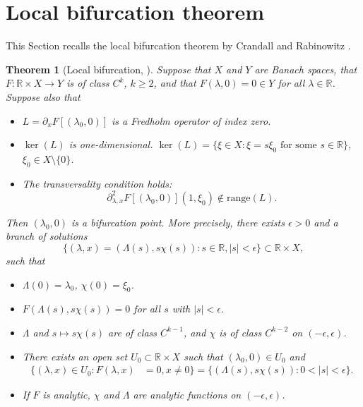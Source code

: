 \documentclass[12pt]{amsart}
\newtheorem{theorem}{Theorem}[section]
\theoremstyle{remark}
\theoremstyle{definition}
\numberwithin{equation}{section}
\begin{document}
\section{Local bifurcation theorem} \label{s:bifurcation}
This Section recalls the local bifurcation theorem by Crandall and Rabinowitz \cite{MR288640}.
\begin{theorem}[Local bifurcation, \cite{MR288640}]
Suppose that $X$ and $Y$ are Banach spaces, that $F : \mathbb{R} \times X \to Y$ is of class $C^k$, $k \geq 2$, and that $F(\lambda, 0) = 0 \in Y$ for all $\lambda \in \mathbb{R}$. Suppose also that
\begin{itemize}
\item $L = \partial_x F[(\lambda_0, 0)]$ is a Fredholm operator of index zero.

\item $\ker(L)$ is one-dimensional.
 $\ker(L) = \{\xi \in X : \xi = s\xi_0 \text{ for some } s \in \mathbb{R} \}$, $\xi_0 \in X \setminus \{0\}$.

\item The transversality condition holds:
\begin{equation*}
\partial_{\lambda, x}^2 F[(\lambda_0, 0)](1, \xi_0) \notin \text{range}(L). 
\end{equation*}
\end{itemize}
Then $(\lambda_0, 0)$ is a bifurcation point. More precisely, there exists $\epsilon > 0$ and a branch of solutions
\[
    \{(\lambda, x) = (\Lambda(s), s\chi(s)) : s \in \mathbb{R}, |s| < \epsilon \} \subset \mathbb{R} \times X,
\]
such that 
\begin{itemize}
\item $\Lambda(0) = \lambda_0$, $\chi(0) = \xi_0$.

\item $F(\Lambda(s), s\chi(s)) = 0$ for all $s$ with $|s| < \epsilon$.

\item $\Lambda$ and $s \mapsto s\chi(s)$ are of class $C^{k-1}$, and $\chi$ is of class $C^{k-2}$ on $(-\epsilon, \epsilon)$.

\item There exists an open set $U_0 \subset \mathbb{R} \times X$ such that $(\lambda_0, 0) \in U_0$ and
\begin{align*}
\{(\lambda, x) \in U_0 : F(\lambda, x) &= 0, x \neq 0\} = \{(\Lambda(s), s\chi(s)) : 0 < |s| < \epsilon\}.
    \end{align*}
\item If $F$ is analytic, $\chi$ and $\Lambda$ are analytic functions on $(-\epsilon, \epsilon)$.
\end{itemize}
\end{theorem}
\end{document}
